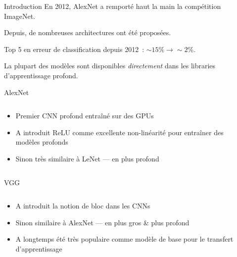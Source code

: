 \begin{frame}{Introduction}
  En 2012, AlexNet a remporté haut la main la compétition ImageNet.

  Depuis, de nombreuses architectures ont été proposées.

  Top 5 en erreur de classification depuis 2012~: $\sim15\% \rightarrow \sim2\%$.

  La plupart des modèles sont disponibles \emph{directement} dans les libraries d'apprentissage profond.
\end{frame}

\begin{frame}{AlexNet}
  \begin{columns}
    \begin{column}{0.5\textwidth}
      \begin{itemize}[<+->]
        \item Premier CNN profond entraîné sur des GPUs
        \item A introduit ReLU comme excellente non-linéarité pour entraîner des modèles profonds
        \item Sinon très similaire à LeNet --- en plus profond
      \end{itemize}
    \end{column}
    \begin{column}{0.5\textwidth}
    \end{column}
  \end{columns}
\end{frame}

\begin{frame}{VGG}
  \begin{columns}
    \begin{column}{0.45\textwidth}
      \begin{itemize}[<+->]
        \item A introduit la notion de bloc dans les CNNs
        \item Sinon similaire à AlexNet --- en plus gros \& plus profond
        \item A longtemps été très populaire comme modèle de base pour le transfert d'apprentissage
      \end{itemize}
    \end{column}
    \begin{column}{0.55\textwidth}
    \end{column}
  \end{columns}
\end{frame}


